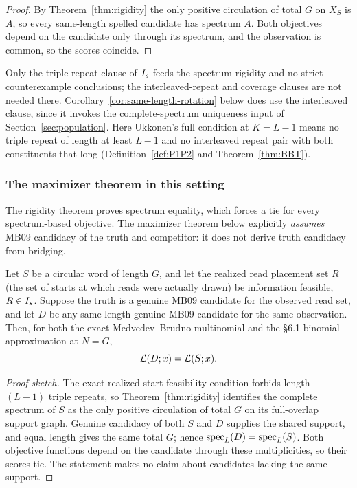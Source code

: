 \begin{proof}
By Theorem~\ref{thm:rigidity} the only positive circulation of total $G$ on
$X_S$ is $A$, so every same-length spelled candidate has spectrum $A$. Both
objectives depend on the candidate only through its spectrum, and the
observation is common, so the scores coincide.
\end{proof}

Only the triple-repeat clause of $I_s$ feeds the spectrum-rigidity and
no-strict-counterexample conclusions; the interleaved-repeat and coverage clauses
are not needed there. Corollary~\ref{cor:same-length-rotation} below does use the
interleaved clause, since it invokes the complete-spectrum uniqueness input of
Section~\ref{sec:population}. Here Ukkonen's full condition at
$K=L-1$ means no triple repeat of length at least $L-1$ and
no interleaved repeat pair with both constituents that long
(Definition~\ref{def:P1P2} and Theorem~\ref{thm:BBT}).

\subsubsection{The maximizer theorem in this setting}

The rigidity theorem proves spectrum equality, which forces a tie for
every spectrum-based objective. The maximizer theorem below explicitly
\emph{assumes} MB09 candidacy of the truth and competitor:
it does not derive truth candidacy from bridging.

\begin{theorem}
\label{thm:maximizer}
Let $S$ be a circular word of length $G$, and let the realized read placement
set $R$ (the set of starts at which reads were actually drawn) be information
feasible, $R\in I_s$. Suppose the truth is a genuine MB09 candidate for the
observed read set, and let $D$ be any same-length genuine MB09 candidate for the
same observation. Then, for both the exact
Medvedev--Brudno multinomial and the §6.1 binomial approximation at $N=G$,
\[
  \mathcal{L}(D;x) = \mathcal{L}(S;x).
\]
\end{theorem}
\begin{proof}[Proof sketch]
The exact realized-start feasibility condition forbids
length-$(L-1)$ triple repeats, so Theorem~\ref{thm:rigidity}
identifies the complete spectrum of $S$ as the only positive
circulation of total $G$ on its full-overlap support graph.
Genuine candidacy of both $S$ and $D$ supplies the shared support,
and equal length gives the same total $G$; hence
$\operatorname{spec}_L(D)=\operatorname{spec}_L(S)$. Both objective functions depend on the
candidate through these multiplicities, so their scores tie.
The statement makes no claim about candidates lacking the
same support.
\end{proof}

